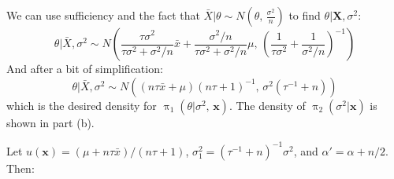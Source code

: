 \documentclass[11pt]{article}
\begin{document}
We can use sufficiency and the fact that $\bar{X}|\theta \sim N(\theta, \, \frac{\sigma^2}{n})$ to find $\theta|\mathbf{X}, \sigma^2$:
\[ \theta | \bar{X}, \sigma^2 \sim 
  N\left(
    \frac{\tau\sigma^2}{\tau\sigma^2 + \sigma^2/n}\bar{x} + \frac{\sigma^2/n}{\tau\sigma^2 + \sigma^2/n}\mu, \,
    \left( \frac{1}{\tau\sigma^2} + \frac{1}{\sigma^2/n}\right)^{-1}
  \right) 
\]
And after a bit of simplification:
\[ \theta | \bar{X}, \sigma^2 \sim 
  N\left(
    (n\tau\bar{x} + \mu)(n\tau + 1)^{-1}, \,
    \sigma^2(\tau^{-1} + n)
  \right) 
\]
which is the desired density for $\operatorname{\pi}_1(\theta | \sigma^2, \, \mathbf{x})$.  The density of $\operatorname{\pi}_2(\sigma^2|\mathbf{x})$ is shown in part (b).
\item %
  Let $u(\mathbf{x}) = (\mu + n\tau\bar x)/(n\tau+1)$, $\sigma_1^2 = (\tau^{-1}+n)^{-1} \sigma^2$, and $\alpha' = \alpha+n/2$.  Then:
\end{document}
